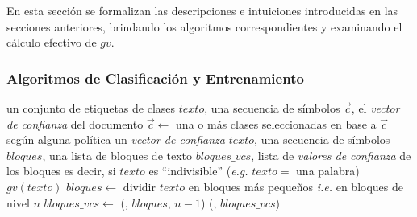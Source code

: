 En esta sección se formalizan las descripciones e intuiciones introducidas en las secciones anteriores, brindando los algoritmos correspondientes y examinando el cálculo efectivo de $gv$.

\subsubsection{Algoritmos de Clasificación y Entrenamiento}

\begin{algorithm}[t!]
\small
\caption{\small Algoritmo de clasificación de SS3.
$MAX\_NIVEL$ es una constante que almacena el nivel máximo de jerarquía utilizado al particionar la entrada. Por ejemplo, debería usarse $MAX\_NIVEL=3$ cuando se trabaje con la partición ``párrafo- oración-palabra''.
La función  aplica ($bloque$, $n-1$) a cada $bloque$ en $bloques$ y devuelve la lista de vectores resultantes.
La función  reduce los vectores en $bloques\_vcs$ a un solo vector utilizando el \emph{operador de resumen} $\oplus_{n-1}$}
\label{alg:classification}
\begin{algorithmic}
\Statex
{} \Returns un conjunto de etiquetas de clases
	\State \Input $texto$, una secuencia de símbolos
	\State \LocalVariables $\overrightarrow{c}$, el \emph{vector de confianza} del documento
	\State
	\State $\overrightarrow{c} \gets$ 
	\State
	\State \Return una o más clases seleccionadas en base a $\overrightarrow{c}$ según alguna política
\EndFunction
\Statex \hrulefill
{} \Returns un \emph{vector de confianza}
	\State \Input $texto$, una secuencia de símbolos
	\State \LocalVariables $bloques$, una lista de bloques de texto
	\State \localvarsindent $bloques\_vcs$, lista de \emph{valores de confianza} de los bloques
	\State
	 \Comment es decir, si $texto$ es ``indivisible'' (\emph{e.g.} $texto=$ una palabra)
		\State \Return $gv(texto)$
	\Else
		\State $bloques \gets$ dividir $texto$ en bloques más pequeños \Comment \emph{i.e.} en bloques de nivel $n$
		\State $bloques\_vcs \gets$ (, $bloques$, $n - 1$)
		\State \Return {}(, $bloques\_vcs$)
	\EndIf
\EndFunction
\end{algorithmic}
\end{algorithm}

